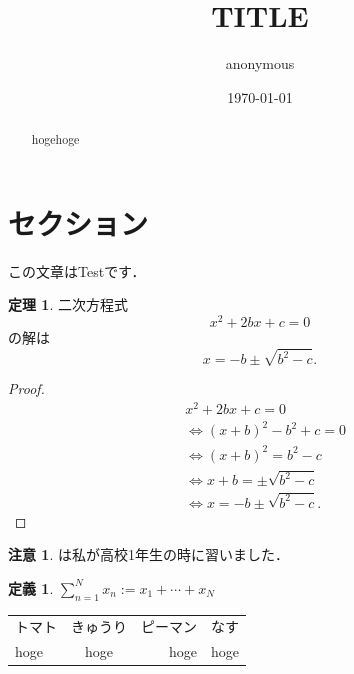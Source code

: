 \documentclass[a4paper,11pt]{jsarticle}
\theoremstyle{definition}
\newtheorem{theorem}{定理}[section]
\newtheorem{definition}[definition]{定義}
\newtheorem{remark}[remark]{注意}
\numberwithin{equation}{section}
\begin{document}
\title{
    TITLE
}
\author{
    anonymous 
}
\date{\today}




\maketitle

\begin{abstract}
hogehoge
\end{abstract}

\section{セクション}

この文章は\textcolor{red!80!black}{Test}です．
\begin{theorem}
    \label{theo:test}
    二次方程式
    \[
        x^2 + 2 b x +c = 0 
    \]
    の解は
    \[
        x = - b \pm \sqrt{b^2-c }
        .
    \]
\end{theorem}

\begin{proof}
    \begin{align*}
        & 
        x^2 + 2 b x +c = 0 
        \\
        & \Leftrightarrow
        (x + b)^2 -b^2 +c = 0 
        \\
        & \Leftrightarrow
        (x + b)^2 = b^2 -c
        \\
        & \Leftrightarrow
        x + b = \pm \sqrt{b^2 -c} %
        \\
        & \Leftrightarrow
        x = -b \pm \sqrt{b^2 -c}
        .  
    \end{align*}
\end{proof}

\begin{remark}
    は私が高校1年生の時に習いました．
\end{remark}

\begin{definition}
    $\sum_{n=1}^N x_n := x_1 + \cdots + x_N$
\end{definition}

\begin{table}
    \begin{tabular}{l|crp{3cm}}
        トマト & きゅうり & ピーマン & なす 
        \hline
        \\
        hoge & hoge & hoge & hoge
    \end{tabular}
\end{table}
\end{document}
